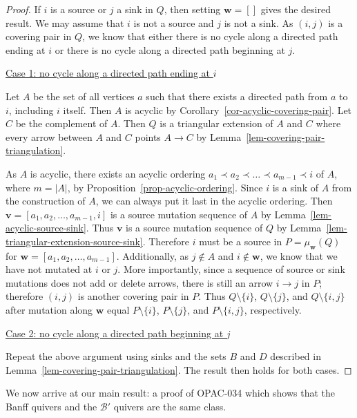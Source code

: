 \documentclass[10pt]{amsart}
\theoremstyle{definition}
\theoremstyle{remark}
\newcommand{\BB}{\mathcal{B}}
\newcommand{\bw}{{\boldsymbol{w}}}
\newcommand{\bv}{{\boldsymbol{v}}}
\begin{document}
\begin{proof}
    If $i$ is a source or $j$ a sink in $Q$, then setting $\bw = []$ gives the desired result.
    We may assume that $i$ is not a source and $j$ is not a sink.
    As $(i,j)$ is a covering pair in $Q$, we know that either there is no cycle along a directed path ending at $i$ or there is no cycle along a directed path beginning at $j$.

    \underline{Case 1: no cycle along a directed path ending at $i$}

    Let $A$ be the set of all vertices $a$ such that there exists a directed path from $a$ to $i$, including $i$ itself.
    Then $A$ is acyclic by Corollary~\ref{cor-acyclic-covering-pair}.
    Let $C$ be the complement of $A$.
    Then $Q$ is a triangular extension of $A$ and $C$ where every arrow between $A$ and $C$ points $A \to C$ by Lemma~\ref{lem-covering-pair-triangulation}.

    As $A$ is acyclic, there exists an acyclic ordering $a_1 \prec a_2 \prec \dots \prec a_{m-1} \prec i$ of $A$, where $m = |A|$, by Proposition~\ref{prop-acyclic-ordering}.
    Since $i$ is a sink of $A$ from the construction of $A$, we can always put it last in the acyclic ordering.
    Then $\bv = [a_1,a_{2},\dots,a_{m-1},i]$ is a source mutation sequence of $A$ by Lemma~\ref{lem-acyclic-source-sink}.
    Thus $\bv$ is a source mutation sequence of $Q$ by Lemma~\ref{lem-triangular-extension-source-sink}.
    Therefore $i$ must be a source in $P = \mu_{\bw}(Q)$ for $\bw = [a_1,a_2,\dots,a_{m-1}]$.
    Additionally, as $j \notin A$ and $i \notin \bw$, we know that we have not mutated at $i$ or $j$.
    More importantly, since a sequence of source or sink mutations does not add or delete arrows, there is still an arrow $i \to j$ in $P$; therefore $(i,j)$ is another covering pair in $P$.
    Thus $Q \setminus \{i\}$, $Q \setminus \{j\}$, and $Q \setminus \{i,j\}$ after mutation along $\bw$ equal $P \setminus \{i\}$, $P \setminus \{j\}$, and $P \setminus \{i,j\}$, respectively.
    
    \underline{Case 2: no cycle along a directed path beginning at $j$}

    Repeat the above argument using sinks and the sets $B$ and $D$ described in Lemma~\ref{lem-covering-pair-triangulation}.
    The result then holds for both cases.
\end{proof}

We now arrive at our main result: a proof of OPAC-034 which shows that the Banff quivers and the $\BB'$ quivers are the same class.
\end{document}
